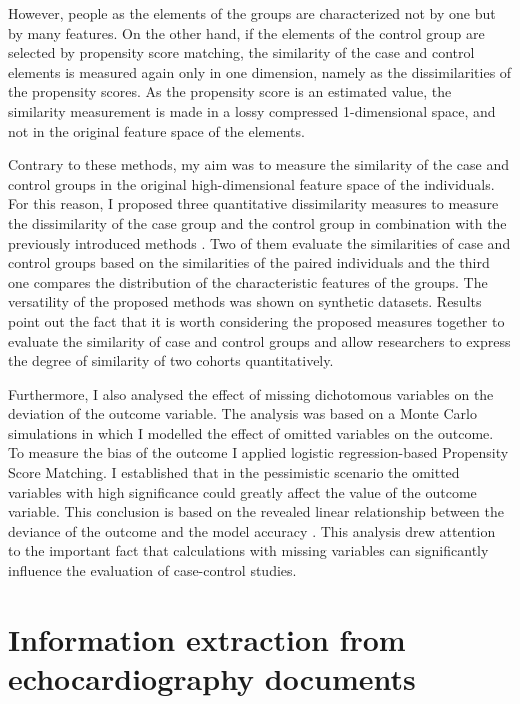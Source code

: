 However, people as the elements of the groups are characterized not by one but by many features. On the other hand, if the elements of the control group are selected by propensity score matching, the similarity of the case and control elements is measured again only in one dimension, namely as the dissimilarities of the propensity scores. As the propensity score is an estimated value, the similarity measurement is made in a lossy compressed 1-dimensional space, and not in the original feature space of the elements.

Contrary to these methods, my aim was to measure the similarity of the case and control groups in the original high-dimensional feature space of the individuals. For this reason, I proposed three quantitative dissimilarity measures to measure the dissimilarity of the case group and the control group in combination with the previously introduced methods \cite{szeker2018measuring, szeker2019can}. Two of them evaluate the similarities of case and control groups based on the similarities of the paired individuals and the third one compares the distribution of the characteristic features of the groups. The versatility of the proposed methods was shown on synthetic datasets. Results point out the fact that it is worth considering the proposed measures together to evaluate the similarity of case and control groups and allow researchers to express the degree of similarity of two cohorts quantitatively.

Furthermore, I also analysed the effect of missing dichotomous variables on the deviation of the outcome variable. The analysis was based on a Monte Carlo simulations in which I modelled the effect of omitted variables on the outcome. To measure the bias of the outcome I applied logistic regression-based Propensity Score Matching. I established that in the pessimistic scenario the omitted variables with high significance could greatly affect the value of the outcome variable. This conclusion is based on the revealed linear relationship between the deviance of the outcome and the model accuracy \cite{szeker2018effect}. This analysis drew attention to the important fact that calculations with missing variables can significantly influence the evaluation of case-control studies.

\section{Information extraction from echocardiography documents}
\label{sec:tm_intro}

